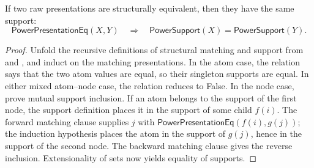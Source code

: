 \begin{lemma}
If two raw presentations are structurally equivalent, then they have the same
support:
\[
\mathsf{PowerPresentationEq}(X,Y)
\quad\Longrightarrow\quad
\mathsf{PowerSupport}(X)=\mathsf{PowerSupport}(Y).
\]
\end{lemma}
\begin{proof}
Unfold the recursive definitions of structural matching and support from
 and , and induct on the
matching presentations.  In the atom case, the relation says that the two
atom values are equal, so their singleton supports are equal.  In either
mixed atom--node case, the relation reduces to False.  In the node case,
prove mutual support inclusion.  If an atom belongs to the support of the
first node, the support definition places it in the support of some child
$f(i)$.  The forward matching clause supplies $j$ with
$\mathsf{PowerPresentationEq}(f(i),g(j))$; the induction hypothesis places
the atom in the support of $g(j)$, hence in the support of the second node.
The backward matching clause gives the reverse inclusion.  Extensionality of
sets now yields equality of supports.
\end{proof}
